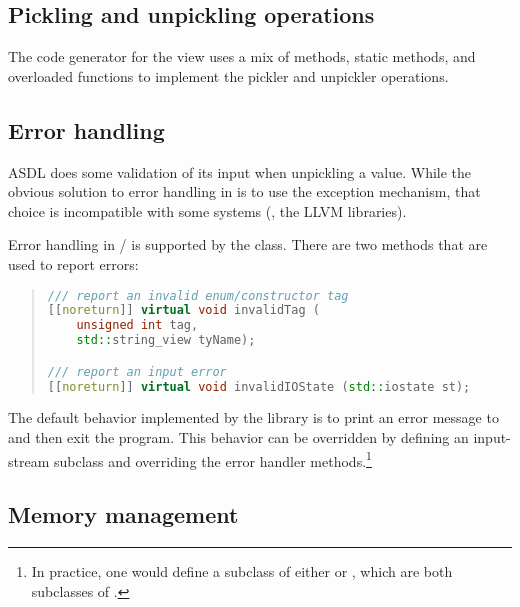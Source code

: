 \subsection{Pickling and unpickling operations}

The code generator for the \Cplusplus{} view uses a mix of methods, static methods,
and overloaded functions to implement the pickler and unpickler operations.

\subsection{Error handling}
ASDL does some validation of its input when unpickling a value.
While the obvious solution to error handling in \Cplusplus{} is to use the exception
mechanism, that choice is incompatible with some systems (\eg{}, the LLVM libraries).

Error handling in \asdl{}/\Cplusplus{} is supported by the  class.
There are two  methods that are used to report errors:
%
\begin{quote}\begin{lstlisting}[language=c++]
/// report an invalid enum/constructor tag
[[noreturn]] virtual void invalidTag (
    unsigned int tag,
    std::string_view tyName);

/// report an input error
[[noreturn]] virtual void invalidIOState (std::iostate st);
\end{lstlisting}
\end{quote}%
%
The default behavior implemented by the \asdl{} library is to print an error message
to  and then exit the program.
This behavior can be overridden by defining an input-stream subclass and overriding
the error handler methods.\footnote{
  In practice, one would define a subclass of either 
  or , which are both subclasses of .
}

\subsection{Memory management}

